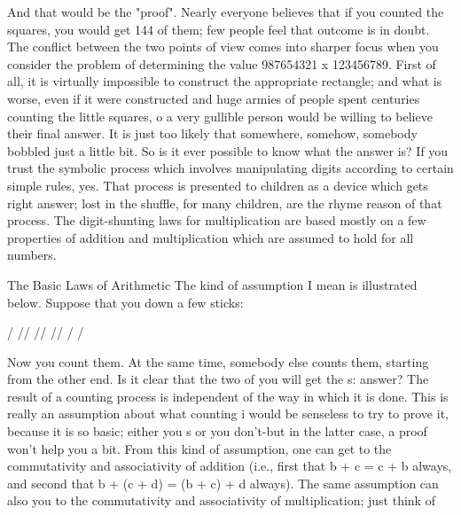 And that would be the "proof". Nearly everyone believes that if you counted the squares, you would get 144 of them; few people feel that outcome is in doubt. The conflict between the two points of view comes into sharper focus when you consider the problem of determining the value 987654321 x 123456789. First of all, it is virtually impossible to construct the appropriate rectangle; and what is worse, even if it were constructed and huge armies of people spent centuries counting the little squares, o a very gullible person would be willing to believe their final answer. It is just too likely that somewhere, somehow, somebody bobbled just a little bit. So is it ever possible to know what the answer is? If you trust the symbolic process which involves manipulating digits according to certain simple rules, yes. That process is presented to children as a device which gets right answer; lost in the shuffle, for many children, are the rhyme reason of that process. The digit-shunting laws for multiplication are based mostly on a few properties of addition and multiplication which are assumed to hold for all numbers. 

The Basic Laws of Arithmetic The kind of assumption I mean is illustrated below. Suppose that you down a few sticks: 

/ // // // / / 

Now you count them. At the same time, somebody else counts them, starting from the other end. Is it clear that the two of you will get the s: answer? The result of a counting process is independent of the way in which it is done. This is really an assumption about what counting i would be senseless to try to prove it, because it is so basic; either you s or you don't-but in the latter case, a proof won't help you a bit. From this kind of assumption, one can get to the commutativity and associativity of addition (i.e., first that b + c = c + b always, and second that b + (c + d) = (b + c) + d always). The same assumption can also you to the commutativity and associativity of multiplication; just think of 








